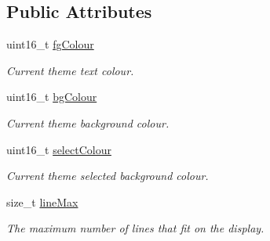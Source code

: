 \subsection*{Public Attributes}
\begin{DoxyCompactItemize}
\item 
\mbox{\label{classDisplay_aa6a2bd6e8f05a0794ff6b32c30723245}} 
uint16\+\_\+t \mbox{\hyperlink{classDisplay_aa6a2bd6e8f05a0794ff6b32c30723245}{fg\+Colour}}
\begin{DoxyCompactList}\small\item\em Current theme text colour. \end{DoxyCompactList}\item 
\mbox{\label{classDisplay_a23a0f9867d7ba82c45a3c612c84e0504}} 
uint16\+\_\+t \mbox{\hyperlink{classDisplay_a23a0f9867d7ba82c45a3c612c84e0504}{bg\+Colour}}
\begin{DoxyCompactList}\small\item\em Current theme background colour. \end{DoxyCompactList}\item 
\mbox{\label{classDisplay_a1487285b39c53295e92cad6b3074a924}} 
uint16\+\_\+t \mbox{\hyperlink{classDisplay_a1487285b39c53295e92cad6b3074a924}{select\+Colour}}
\begin{DoxyCompactList}\small\item\em Current theme selected background colour. \end{DoxyCompactList}\item 
\mbox{\label{classDisplay_a7183e09a442a157a00391639a34cd4d8}} 
size\+\_\+t \mbox{\hyperlink{classDisplay_a7183e09a442a157a00391639a34cd4d8}{line\+Max}}
\begin{DoxyCompactList}\small\item\em The maximum number of lines that fit on the display. \end{DoxyCompactList}\end{DoxyCompactItemize}
